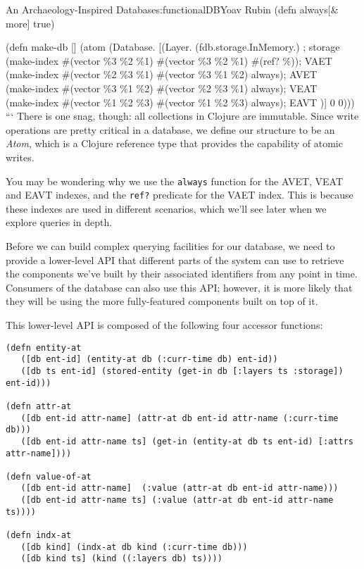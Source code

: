 \begin{aosachapter}{An Archaeology-Inspired Database}{s:functionalDB}{Yoav Rubin}
(defn always{[}\& more{]} true)

(defn make-db {[}{]} (atom (Database. {[}(Layer. (fdb.storage.InMemory.)
; storage (make-index \#(vector \%3 \%2 \%1) \#(vector \%3 \%2 \%1)
\#(ref? \%)); VAET\\ (make-index \#(vector \%2 \%3 \%1) \#(vector \%3
\%1 \%2) always); AVET\\ (make-index \#(vector \%3 \%1 \%2) \#(vector
\%2 \%3 \%1) always); VEAT\\ (make-index \#(vector \%1 \%2 \%3)
\#(vector \%1 \%2 \%3) always); EAVT ){]} 0 0))) ``` There is one snag,
though: all collections in Clojure are immutable. Since write operations
are pretty critical in a database, we define our structure to be an
\emph{Atom}, which is a Clojure reference type that provides the
capability of atomic writes.

You may be wondering why we use the \texttt{always} function for the
AVET, VEAT and EAVT indexes, and the \texttt{ref?} predicate for the
VAET index. This is because these indexes are used in different
scenarios, which we'll see later when we explore queries in depth.

\label{basic-accessors}

Before we can build complex querying facilities for our database, we
need to provide a lower-level API that different parts of the system can
use to retrieve the components we've built by their associated
identifiers from any point in time. Consumers of the database can also
use this API; however, it is more likely that they will be using the
more fully-featured components built on top of it.

This lower-level API is composed of the following four accessor
functions:

\begin{verbatim}
(defn entity-at
   ([db ent-id] (entity-at db (:curr-time db) ent-id))
   ([db ts ent-id] (stored-entity (get-in db [:layers ts :storage]) ent-id)))

(defn attr-at
   ([db ent-id attr-name] (attr-at db ent-id attr-name (:curr-time db)))
   ([db ent-id attr-name ts] (get-in (entity-at db ts ent-id) [:attrs attr-name])))

(defn value-of-at
   ([db ent-id attr-name]  (:value (attr-at db ent-id attr-name)))
   ([db ent-id attr-name ts] (:value (attr-at db ent-id attr-name ts))))

(defn indx-at
   ([db kind] (indx-at db kind (:curr-time db)))
   ([db kind ts] (kind ((:layers db) ts))))
\end{verbatim}


\end{aosachapter}
